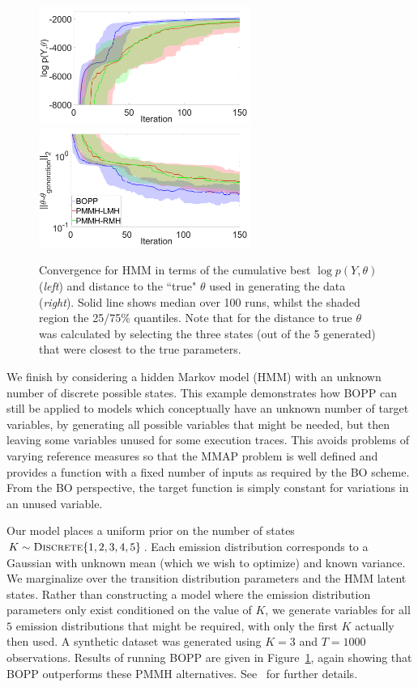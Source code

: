 
\begin{figure}[t]
	\centering
	\includegraphics[width=2.72in]{hmm/hmm_ML}
	~~~~~~
	\includegraphics[width=2.72in]{hmm/hmm_distance}
	\caption{Convergence for HMM in terms of the cumulative best $\log p\left(Y,\theta\right)$ (\emph{left}) and distance to the ``true" $\theta$ used in generating the data (\emph{right}). Solid line shows median over 100 runs, whilst the shaded region the 25/75\% quantiles.  Note that for the distance to true $\theta$ was calculated by selecting the three states (out of the 5 generated) that were closest to the true parameters.  \label{fig:hmm}}
\end{figure}

We finish by considering a hidden Markov model (HMM) with an unknown number of discrete possible states.  
This example demonstrates how BOPP can still be applied to models which conceptually have an 
unknown number of target variables, by generating all possible variables that might be needed, 
but then leaving some variables unused for some execution traces.  This avoids problems 
of varying reference measures so that the MMAP problem is well defined  and provides a 
function with a fixed number of inputs as required by the BO scheme.  From the BO 
perspective, the target function is simply constant for variations in an unused variable.

Our model places a uniform prior on the number of states $K \sim \textsc{Discrete}\{1,2,3,4,5\}$.
Each emission distribution corresponds to a Gaussian with unknown mean (which we wish to
optimize) and known variance.  
We marginalize over the transition distribution parameters and the HMM latent states.  
Rather than constructing a model where the emission distribution
parameters only exist conditioned on the value of $K$, we generate variables for all $5$ emission
distributions that might be required, with only the first $K$ actually then used.  
A synthetic dataset was generated using $K=3$ and $T=1000$ observations.  Results of running BOPP are given
in Figure~\ref{fig:hmm}, again showing that BOPP outperforms these PMMH alternatives.  See~\cite{rainforth2017boppArxiv}
for further details.